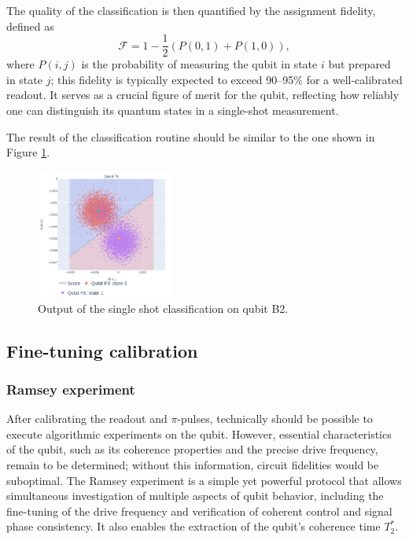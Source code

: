 The quality of the classification is then quantified by the assignment fidelity, defined as \cite{gao_practical_2021} 
\begin{equation}
    \mathcal{F} = 1 -\frac{1}{2}(P(0,1)+P(1,0)),
\end{equation}
where $P(i,j)$ is the probability of measuring the qubit in state $i$ but prepared in state $j$; this fidelity is typically expected to exceed 90–95\% for a well-calibrated readout. 
It serves as a crucial figure of merit for the qubit, reflecting how reliably one can distinguish its quantum states in a single-shot measurement. 

The result of the classification routine should be similar to the one shown in Figure \ref{fig:classification}.

\begin{figure}[h!]
    \centering
    \includegraphics[width=0.4\textwidth]{figures/png/classification.png}
    \caption{Output of the single shot classification on qubit B2.}
    \label{fig:classification}
\end{figure}

\subsection{Fine-tuning calibration}

\subsubsection{Ramsey experiment}\label{subsec:Ramsey}
After calibrating the readout and $\pi$-pulses, technically should be possible to execute algorithmic experiments on the qubit. 
However, essential characteristics of the qubit, such as its coherence properties and the precise drive frequency, remain to be determined; without this information, circuit fidelities would be suboptimal. 
The Ramsey experiment is a simple yet powerful protocol that allows simultaneous investigation of multiple aspects of qubit behavior, including the fine-tuning of the drive frequency and verification of coherent control and signal phase consistency. 
It also enables the extraction of the qubit's coherence time $T_2^*$.

